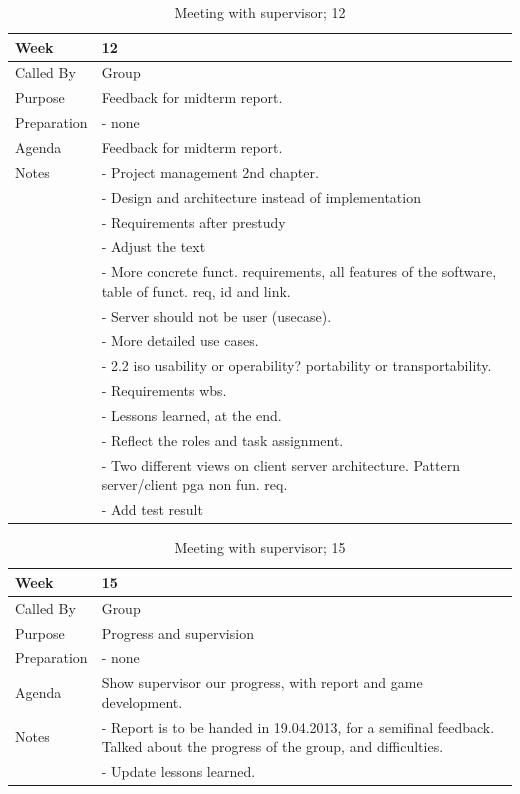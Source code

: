 {\footnotesize
\begin{table}[H]
\begin{tabular}{| p{5cm} | p{10cm} |}\hline
	\textbf{Week}	& \textbf{12} \\ \hline
	Called	By		& Group\\ \hline
	Purpose		& Feedback for midterm report.\\ \hline
	Preparation 
		& - none\\ 
		
	Agenda
		& Feedback for midterm report. \\

	Notes	& - Project management 2nd chapter.\\
& - Design and architecture instead of implementation\\
& - Requirements after prestudy\\
& - Adjust the text\\
& - More concrete funct. requirements, all features of the software, table of funct. req, id and link.\\
& - Server should not be user (usecase).\\
& - More detailed use cases.\\
& - 2.2 iso usability or operability? portability or transportability.\\
& - Requirements wbs.\\
& - Lessons learned, at the end.\\
& - Reflect the roles and task assignment.\\
& - Two different views on client server architecture. Pattern server/client pga non fun. req.\\
& - Add test result \\ \hline
	
\end{tabular}


\caption{Meeting with supervisor; 12}
\label{fig:s_meeting_12}
\end{table}}


{\footnotesize
\begin{table}[H]
\begin{tabular}{| p{5cm} | p{10cm} |}\hline
	\textbf{Week}	& \textbf{15} \\ \hline
	Called	By		& Group\\ \hline
	Purpose		& Progress and supervision\\ \hline
	Preparation 
		& - none\\ 
		
	Agenda
		& Show supervisor our progress, with report and game development. \\

	Notes	& - Report is to be handed in 19.04.2013, for a semifinal feedback. Talked about the progress of the group, and difficulties. \\
	& - Update lessons learned.\\ \hline
	
\end{tabular}


\caption{Meeting with supervisor; 15}
\label{fig:s_meeting_15}
\end{table}}


